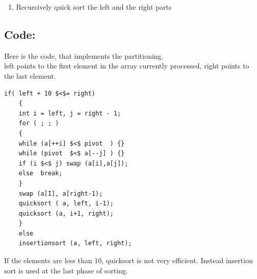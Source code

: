 \documentclass[10pt,a4paper]{article}
\begin{document}
\begin{enumerate}
\begin{enumerate}
			[5, 3, 25, 6, 10, 17, 1, 2, 18, 8]\\
			\^\qquad\qquad\qquad\qquad\qquad\qquad\^\\
			i \qquad\qquad\qquad\qquad\qquad\qquad j\\
			\begin{enumerate}
				\item  While i is to the left of j, we move i right, skipping all the elements less than the pivot. If an element is found greater then the pivot, i stops
				\item  While j is to the right of i, we move j left, skipping all the elements greater than the pivot. If an element is found less then the pivot, j stops
				\item  When both i and j have stopped, the elements are swapped.
				\item  When i and j have crossed, no swap is performed, scanning stops, and the element pointed to by i is swapped with the pivot .In the example the first swapping will be between 25 and 2, the second between 10 and 1.
			\end{enumerate}
			3. Restore the pivot.
			After restoring the pivot we obtain the following partitioning into three groups:\\
			$[5, 3, 2, 6, 1] [ 8 ] [10, 25, 18, 17]$
			
		\end{enumerate}
		
		\item Recursively quick sort the left and the right parts
	\end{enumerate}

\subsection{Code:}
	Here is the code, that implements the partitioning.\\
	left points to the first element in the array currently processed, right points to the last element. \\
	\lstset{language=C}          
	\begin{lstlisting}[frame=single] 
	if( left + 10 $<$= right)
	{
	int i = left, j = right - 1;
	for ( ; ; )
	{
	while (a[++i] $<$ pivot  ) {}  
	while (pivot  $<$ a[--j] ) {}   
	if (i $<$ j) swap (a[i],a[j]); 
	else  break;     
	}
	swap (a[I], a[right-1);  
	quicksort ( a, left, i-1);  
	quicksort (a, i+1, right);
	}
	else 
	insertionsort (a, left, right);
	\end{lstlisting}
	If the elements are less than 10, quicksort is not very efficient. 
	Instead insertion sort is used at the last phase of sorting.
	
\end{document}
